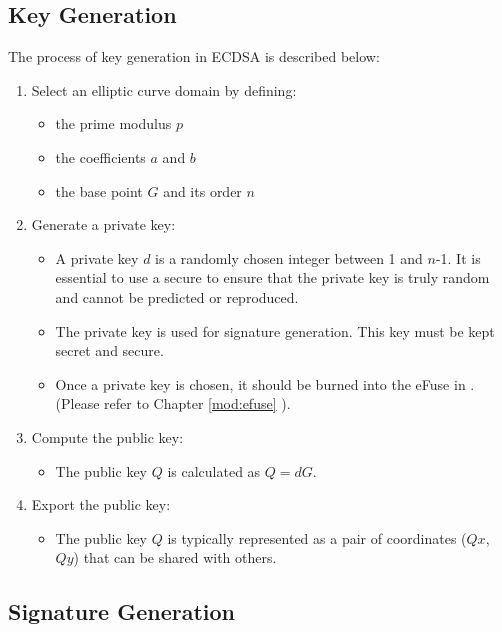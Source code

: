 \documentclass[main\_\_EN.tex]{subfiles}
\begin{document}
\subsection{Key Generation}

The process of key generation in ECDSA is described below:
\begin{enumerate}
    \item Select an elliptic curve domain by defining:
    \begin{itemize}
        \item the prime modulus $p$
        \item the coefficients $a$ and $b$
        \item the base point $G$ and its order $n$
    \end{itemize}
    \item Generate a private key:
    \begin{itemize}
        \item A private key $d$ is a randomly chosen integer between 1 and $n$-1. It is essential to use a secure \textit{} to ensure that the private key is truly random and cannot be predicted or reproduced.
        \item The private key is used for signature generation. This key must be kept secret and secure.
        \item Once a private key is chosen, it should be burned into the eFuse in \chipname{}. (Please refer to Chapter \ref{mod:efuse} \textit{}).
    \end{itemize}
    \item Compute the public key:
    \begin{itemize}
        \item The public key $Q$ is calculated as $Q = dG$.
    \end{itemize}
    \item Export the public key:
    \begin{itemize}
        \item The public key $Q$ is typically represented as a pair of coordinates ($Qx$, $Qy$) that can be shared with others.
    \end{itemize}
\end{enumerate}

\subsection{Signature Generation}
\end{document}
